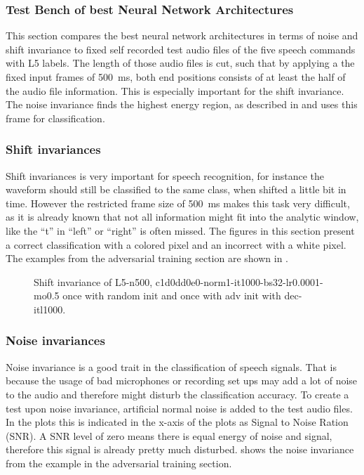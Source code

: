 \subsubsection{Test Bench of best Neural Network Architectures}\label{sec:exp_tb}
\thesisStateNotReady
This section compares the best neural network architectures in terms of noise and shift invariance to fixed self recorded test audio files of the five speech commands with L5 labels.
The length of those audio files is cut, such that by applying a the fixed input frames of \SI{500}{\milli\second}, both end positions consists of at least the half of the audio file information.
This is especially important for the shift invariance.
The noise invariance finds the highest energy region, as described in  and uses this frame for classification.


\subsubsection{Shift invariances}
Shift invariances is very important for speech recognition, for instance the waveform should still be classified to the same class, when shifted a little bit in time.
However the restricted frame size of \SI{500}{\milli\second} makes this task very difficult, as it is already known that not all information might fit into the analytic window, like the \enquote{t} in \enquote{left} or \enquote{right} is often missed.
The figures in this section present a correct classification with a colored pixel and an incorrect with a white pixel.
The examples from the adversarial training section are shown in .
\begin{figure}[!ht]
  \centering
  \caption{Shift invariance of L5-n500, c1d0dd0e0-norm1-it1000-bs32-lr0.0001-mo0.5 once with random init and once with adv init with dec-itl1000.}
  \label{fig:exp_tb_shift_fc3}
\end{figure}
\FloatBarrier
\noindent



\subsubsection{Noise invariances}
Noise invariance is a good trait in the classification of speech signals.
That is because the usage of bad microphones or recording set ups may add a lot of noise to the audio and therefore might disturb the classification accuracy.
To create a test upon noise invariance, artificial normal noise is added to the test audio files.
In the plots this is indicated in the x-axis of the plots as Signal to Noise Ration (SNR).
A SNR level of zero means there is equal energy of noise and signal, therefore this signal is already pretty much disturbed.
 shows the noise invariance from the example in the adversarial training section.

